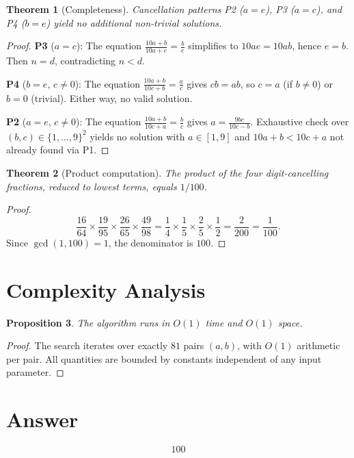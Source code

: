 \documentclass[12pt]{article}
\newtheorem{theorem}{Theorem}
\newtheorem{proposition}[theorem]{Proposition}
\theoremstyle{definition}
\begin{document}
\begin{theorem}[Completeness]
Cancellation patterns P2 ($a = e$), P3 ($a = c$), and P4 ($b = e$) yield no additional non-trivial solutions.
\end{theorem}

\begin{proof}
\textbf{P3} ($a = c$): The equation $\frac{10a+b}{10a+e} = \frac{b}{e}$ simplifies to $10ae = 10ab$, hence $e = b$. Then $n = d$, contradicting $n < d$.

\textbf{P4} ($b = e$, $c \ne 0$): The equation $\frac{10a+b}{10c+b} = \frac{a}{c}$ gives $cb = ab$, so $c = a$ (if $b \ne 0$) or $b = 0$ (trivial). Either way, no valid solution.

\textbf{P2} ($a = e$, $c \ne 0$): The equation $\frac{10a+b}{10c+a} = \frac{b}{c}$ gives $a = \frac{9bc}{10c - b}$. Exhaustive check over $(b,c) \in \{1,\ldots,9\}^2$ yields no solution with $a \in [1,9]$ and $10a+b < 10c+a$ not already found via P1.
\end{proof}

\begin{theorem}[Product computation]
The product of the four digit-cancelling fractions, reduced to lowest terms, equals $1/100$.
\end{theorem}

\begin{proof}
\[
\frac{16}{64} \times \frac{19}{95} \times \frac{26}{65} \times \frac{49}{98}
= \frac{1}{4} \times \frac{1}{5} \times \frac{2}{5} \times \frac{1}{2}
= \frac{2}{200} = \frac{1}{100}.
\]
Since $\gcd(1,100) = 1$, the denominator is $100$.
\end{proof}

\section{Complexity Analysis}

\begin{proposition}
The algorithm runs in $O(1)$ time and $O(1)$ space.
\end{proposition}

\begin{proof}
The search iterates over exactly $81$ pairs $(a,b)$, with $O(1)$ arithmetic per pair. All quantities are bounded by constants independent of any input parameter.
\end{proof}

\section{Answer}

\[
\boxed{100}
\]
\end{document}

